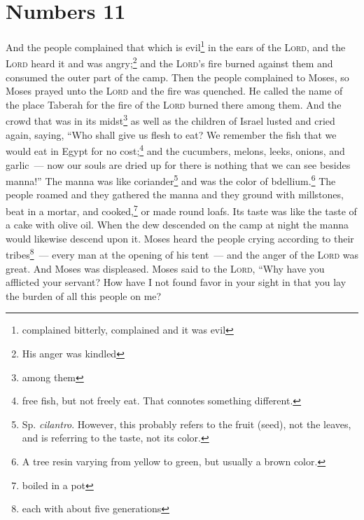 \section{Numbers 11}\label{Numbers 11}
\begin{enumerate}
     And the people complained that which is evil\footnote{complained bitterly, complained and it was evil} in the ears of the \textsc{Lord}, and the \textsc{Lord} heard it and was angry;\footnote{His anger was kindled} and the \textsc{Lord}'s fire burned against them and consumed the outer part of the camp.%
     Then the people complained to Moses, so Moses prayed unto the \textsc{Lord} and the fire was quenched.%
     He called the name of the place Taberah for the fire of the \textsc{Lord} burned there among them.%
     And the crowd that was in its midst\footnote{among them} as well as the children of Israel lusted and cried again, saying, ``Who shall give us flesh to eat?%
     We remember the fish that we would eat in Egypt for no cost;\footnote{free fish, but not freely eat. That connotes something different.} and the cucumbers, melons, leeks, onions, and garlic~---%
     now our souls are dried up for there is nothing that we can see besides manna!''%
     The manna was like coriander\footnote{Sp. \emph{cilantro}. However, this probably refers to the fruit (seed), not the leaves, and is referring to the taste, not its color.} and was the color of bdellium.\footnote{A tree resin varying from yellow to green, but usually a brown color.}%
     The people roamed and they gathered the manna and they ground with millstones, beat in a mortar, and cooked,\footnote{boiled in a pot} or made round loafs. Its taste was like the taste of a cake with olive oil.%
     When the dew descended on the camp at night the manna would likewise descend upon it.%
     Moses heard the people crying according to their tribes\footnote{each with about five generations}~--- every man at the opening of his tent~--- and the anger of the \textsc{Lord} was great. And Moses was displeased.%
     Moses said to the \textsc{Lord}, ``Why have you afflicted your servant? How have I not found favor in your sight in that you lay the burden of all this people on me?%

\end{enumerate}
